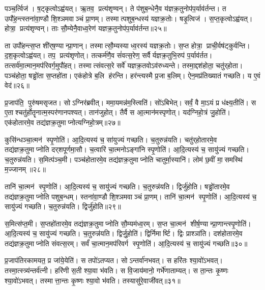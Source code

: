 पञ्च॒र्त्विज॑। ष॒ट्कृत्वोऽह्व॑यत्। ऋ॒तव॒ प्रत्य॑शृण्वन्। ते प॑शुब॒न्धेनै॒व य॑ज्ञक्र॒तुनोप॑प॒र्याव॑र्तन्त। त उपौ॑ह॒न्त्स्तना॑वा॒ण्डौ शि॒श्ञमवाञ्चं प्रा॒णम्। तस्मात्पशुब॒न्धस्य॑ यज्ञक्र॒तोः। षडृ॒त्विज॑। स॒प्त॒कृत्वोऽह्व॑यत्। होत्रा॒ प्रत्य॑शृण्वन्। ताः सौ॒म्येनै॒वाध्व॒रेण॑ यज्ञक्र॒तुनोप॑प॒र्याव॑र्तन्त॥२५॥

ता उपौ॑हन्त्स॒प्त शी॑र्‌ष॒ण्यान्प्रा॒णान्। तस्मात्सौ॒म्यस्याध्व॒रस्य॑ यज्ञक्र॒तोः। स॒प्त होत्रा॒ प्राची॒र्वष॑ट्कुर्वन्ति। द॒श॒कृत्वोऽह्व॑यत्। तप॒ प्रत्य॑शृणोत्। तत्कर्म॑णै॒व सं॑वत्स॒रेण॒ सर्वैर्यज्ञक्र॒तुभि॒रुप॑ प॒र्याव॑र्तत। तत्सर्व॑मा॒त्मान॒मप॑रिवर्ग॒मुपौ॑हत्। तस्मात्संवत्स॒रे सर्वे॑ यज्ञक्र॒तवोऽव॑रुध्यन्ते। तस्मा॒द्दश॑होता॒ चतु॑र्‌होता। पञ्च॑होता॒ षड्ढो॑ता स॒प्तहो॑ता। एक॑होत्रे ब॒लि ह॑रन्ति। हर॑न्त्यस्मै प्र॒जा ब॒लिम्। ऐन॒मप्र॑तिख्यातं गच्छति। य ए॒वं वेद॑॥२६॥\anuvakamend[च॒न्द्रमाश्चातुर्मा॒स्यानाय्यँज्ञक्र॒तोर॑ध्व॒रेण॑ यज्ञक्र॒तुनोप॑ प॒र्याव॑र्तन्त स॒प्तहो॑ता च॒त्वारि॑ च]

प्र॒जाप॑ति॒ पुरु॑षमसृजत। सोऽग्निर॑ब्रवीत्। ममा॒यमन्न॑म॒स्त्विति॑। सो॑ऽबिभेत्। सर्वं॒ वै मा॒ऽयं प्र ध॑क्ष्य॒तीति॑। स ए॒ताश्चतु॑र्\mbox{}होतॄनात्म॒स्पर॑णानपश्यत्। तान॑जुहोत्। तैर्वै स आ॒त्मान॑मस्पृणोत्। यद॑ग्निहो॒त्रं जु॒होति॑। एक॑होतारमे॒व तद्य॑ज्ञक्र॒तुमाप्नोत्यग्निहो॒त्रम्॥२७॥

कुसि॑न्धञ्चा॒त्मन॑ स्पृ॒णोति॑। आ॒दि॒त्यस्य॑ च॒ सा॑युज्यं गच्छति। च॒तुरुन्न॑यति। चतु॑र्‌होतारमे॒व तद्य॑ज्ञक्र॒तुमाप्नोति दर्‌शपूर्णमा॒सौ। च॒त्वारि॑ चा॒त्मनोऽङ्गा॑नि स्पृ॒णोति॑। आ॒दि॒त्यस्य॑ च॒ सायु॑ज्यं गच्छति। च॒तुरुन्न॑यति। स॒मित्प॑ञ्च॒मी। पञ्च॑होतारमे॒व तद्य॑ज्ञक्र॒तुमाप्नोति चातुर्मा॒स्यानि॑। लोम॑ छ॒वीं मा॒समस्थि॑ म॒ज्जानम्॥२८॥

तानि॑ चा॒त्मन॑ स्पृ॒णोति॑। आ॒दि॒त्यस्य॑ च॒ सायु॑ज्यं गच्छति। च॒तुरुन्न॑यति। द्विर्जु॑होति। षड्ढो॑तारमे॒व तद्य॑ज्ञक्र॒तुमाप्नोति पशुब॒न्धम्। स्तना॑वा॒ण्डौ शि॒श्ञमवाञ्चं प्रा॒णम्। तानि॑ चा॒त्मन॑ स्पृ॒णोति॑। आ॒दि॒त्यस्य॑ च॒ सायु॑ज्यं गच्छति। च॒तुरुन्न॑यति। द्विर्जु॑होति॥२९॥

स॒मित्स॑प्त॒मी। स॒प्तहो॑तारमे॒व तद्य॑ज्ञक्र॒तुमाप्नोति सौ॒म्यम॑ध्व॒रम्। स॒प्त चा॒त्मन॑ शीर्\mbox{}ष॒ण्यान्प्रा॒णान्त्स्पृ॒णोति॑। आ॒दि॒त्यस्य॑ च॒ सायु॑ज्यं गच्छति। च॒तुरुन्न॑यति। द्विर्जु॒होति॑। द्विर्निमार्ष्टि। द्विः प्राश्ञा॑ति। दश॑होतारमे॒व तद्य॑ज्ञक्र॒तुमाप्नोति संवत्स॒रम्। सर्वं॑ चा॒त्मान॒मप॑रिवर्ग स्पृ॒णोति॑। आ॒दि॒त्यस्य॑ च॒ सायु॑ज्यं गच्छति॥३०॥\anuvakamend[अ॒ग्नि॒हो॒त्रं म॒ज्जान॒न्द्विर्जु॑हो॒त्यप॑रिवर्ग स्पृ॒णोत्येकं च]

प्र॒जाप॑तिरकामयत॒ प्र जा॑ये॒येति॑। स तपो॑ऽतप्यत। सोऽन्तर्वा॑नभवत्। स हरि॑तः श्या॒वो॑ऽभवत्। तस्मा॒त्स्त्र्य॑न्तर्व॑त्नी। हरि॑णी स॒ती श्या॒वा भ॑वति। स वि॒जाय॑मानो॒ गर्भे॑णाताम्यत्। स ता॒न्तः कृ॒ष्णः श्या॒वो॑ऽभवत्। तस्मात्ता॒न्तः कृ॒ष्णः श्या॒वो भ॑वति। तस्यासु॑रे॒वाजी॑वत्॥३१॥

